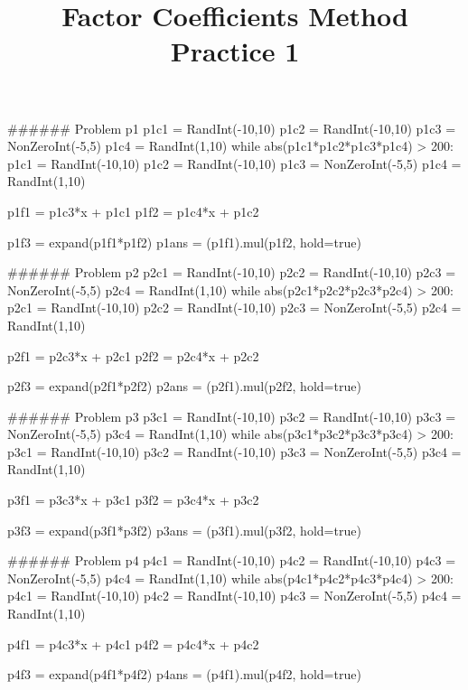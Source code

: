 \documentclass{ximera}
\title{Factor Coefficients Method Practice 1}
\begin{document}


\begin{sagesilent}
###### Problem p1
p1c1 = RandInt(-10,10)
p1c2 = RandInt(-10,10)
p1c3 = NonZeroInt(-5,5)
p1c4 = RandInt(1,10)
while abs(p1c1*p1c2*p1c3*p1c4) > 200:
    p1c1 = RandInt(-10,10)
    p1c2 = RandInt(-10,10)
    p1c3 = NonZeroInt(-5,5)
    p1c4 = RandInt(1,10)

p1f1 = p1c3*x + p1c1
p1f2 = p1c4*x + p1c2

p1f3 = expand(p1f1*p1f2)
p1ans = (p1f1).mul(p1f2, hold=true)


###### Problem p2
p2c1 = RandInt(-10,10)
p2c2 = RandInt(-10,10)
p2c3 = NonZeroInt(-5,5)
p2c4 = RandInt(1,10)
while abs(p2c1*p2c2*p2c3*p2c4) > 200:
    p2c1 = RandInt(-10,10)
    p2c2 = RandInt(-10,10)
    p2c3 = NonZeroInt(-5,5)
    p2c4 = RandInt(1,10)

p2f1 = p2c3*x + p2c1
p2f2 = p2c4*x + p2c2

p2f3 = expand(p2f1*p2f2)
p2ans = (p2f1).mul(p2f2, hold=true)


###### Problem p3
p3c1 = RandInt(-10,10)
p3c2 = RandInt(-10,10)
p3c3 = NonZeroInt(-5,5)
p3c4 = RandInt(1,10)
while abs(p3c1*p3c2*p3c3*p3c4) > 200:
    p3c1 = RandInt(-10,10)
    p3c2 = RandInt(-10,10)
    p3c3 = NonZeroInt(-5,5)
    p3c4 = RandInt(1,10)

p3f1 = p3c3*x + p3c1
p3f2 = p3c4*x + p3c2

p3f3 = expand(p3f1*p3f2)
p3ans = (p3f1).mul(p3f2, hold=true)


###### Problem p4
p4c1 = RandInt(-10,10)
p4c2 = RandInt(-10,10)
p4c3 = NonZeroInt(-5,5)
p4c4 = RandInt(1,10)
while abs(p4c1*p4c2*p4c3*p4c4) > 200:
    p4c1 = RandInt(-10,10)
    p4c2 = RandInt(-10,10)
    p4c3 = NonZeroInt(-5,5)
    p4c4 = RandInt(1,10)

p4f1 = p4c3*x + p4c1
p4f2 = p4c4*x + p4c2

p4f3 = expand(p4f1*p4f2)
p4ans = (p4f1).mul(p4f2, hold=true)


\end{sagesilent}
\end{document}
